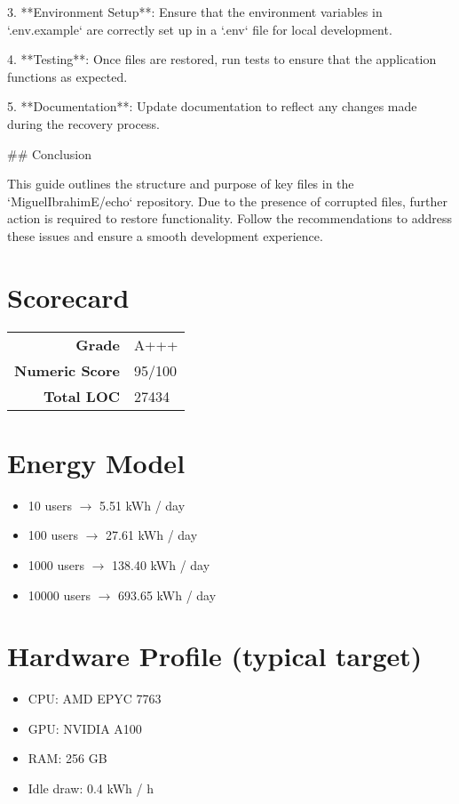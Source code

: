 \documentclass{article}
\begin{document}
\begin{itemize}[leftmargin=*]
3. **Environment Setup**: Ensure that the environment variables in `.env.example` are correctly set up in a `.env` file for local development.

4. **Testing**: Once files are restored, run tests to ensure that the application functions as expected.

5. **Documentation**: Update documentation to reflect any changes made during the recovery process.

## Conclusion

This guide outlines the structure and purpose of key files in the `MiguelIbrahimE/echo` repository. Due to the presence of corrupted files, further action is required to restore functionality. Follow the recommendations to address these issues and ensure a smooth development experience.
\end{itemize}

\section*{Scorecard}
\begin{tabular}{rl}
  \textbf{Grade} & A+++\\
  \textbf{Numeric Score} & 95/100\\
  \textbf{Total LOC} & 27434\\
\end{tabular}

\section*{Energy Model}
\begin{itemize}[leftmargin=*]
    \item 10 users $\rightarrow$ 5.51 kWh / day
    \item 100 users $\rightarrow$ 27.61 kWh / day
    \item 1000 users $\rightarrow$ 138.40 kWh / day
    \item 10000 users $\rightarrow$ 693.65 kWh / day
\end{itemize}


\section*{Hardware Profile (typical target)}
\begin{itemize}[leftmargin=*]
  \item CPU: AMD EPYC 7763
  \item GPU: NVIDIA A100
  \item RAM: 256 GB
  \item Idle draw: 0.4 kWh / h
\end{itemize}
\end{document}
